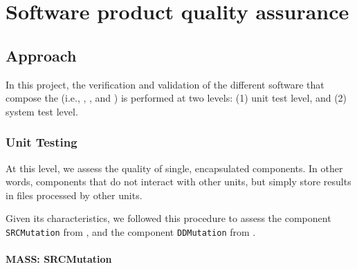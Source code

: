 
\chapter{Software product quality assurance}

%

\section{Approach}

In this project, the verification and validation of the different software that compose the \FAQAS (i.e., \MASS, \SEMUS, and \DAMA) is performed at two levels: (1) unit test level, and (2) system test level.

\subsection{Unit Testing}

At this level, we assess the quality of single, encapsulated components. In other words, components that do not interact with other units, but simply store results in files processed by other units.

Given its characteristics, we followed this procedure to assess the component \texttt{SRCMutation} from \MASS, and the component \texttt{DDMutation} from \DAMA.

\subsubsection{MASS: SRCMutation}

